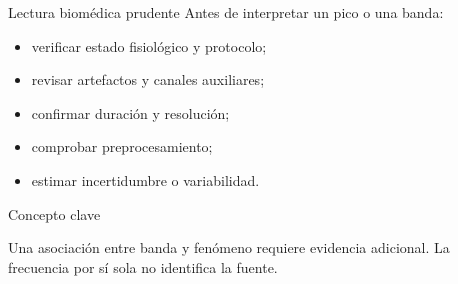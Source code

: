 \documentclass[
  10pt,
  ignorenonframetext,
  aspectratio=169,
  spanish,
]{beamer}
\providecommand{\tightlist}{%
  \setlength{\itemsep}{0pt}\setlength{\parskip}{0pt}}
\begin{document}
\begin{frame}{Lectura biomédica prudente}
\label{d2-096}
Antes de interpretar un pico o una banda:

\begin{itemize}
\tightlist
\item
  verificar estado fisiológico y protocolo;
\item
  revisar artefactos y canales auxiliares;
\item
  confirmar duración y resolución;
\item
  comprobar preprocesamiento;
\item
  estimar incertidumbre o variabilidad.
\end{itemize}

\begin{block}{Concepto clave}

Una asociación entre banda y fenómeno requiere evidencia adicional. La
frecuencia por sí sola no identifica la fuente.

\end{block}

\end{frame}
\end{document}
